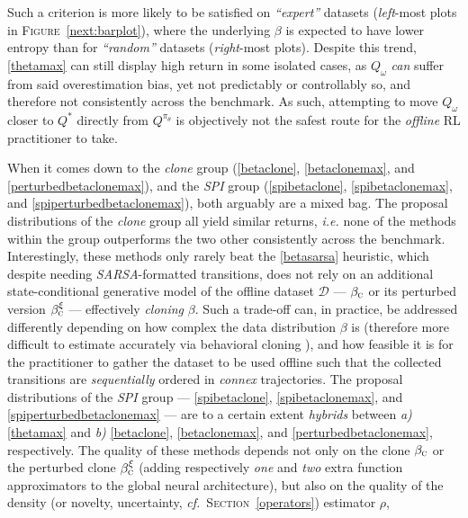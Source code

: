 Such a criterion is more likely to be satisfied
on \textit{``expert''} datasets (\emph{left}-most plots in \textsc{Figure}~\ref{next:barplot}),
where the underlying $\beta$ is expected to have lower entropy
than for \textit{``random''} datasets (\emph{right}-most plots).
Despite this trend, \ref{thetamax} can still display high return in some isolated cases,
as $Q_\omega$ \emph{can} suffer from said overestimation bias, yet not predictably or controllably so,
and therefore not consistently across the benchmark.
As such, attempting to move $Q_\omega$ closer to $Q^*$ directly from $Q^{\pi_\theta}$
is objectively not the safest route for the \emph{offline} RL practitioner to take.

When it comes down to the \textit{clone} group
(\ref{betaclone}, \ref{betaclonemax}, and \ref{perturbedbetaclonemax}),
and the \textit{SPI} group
(\ref{spibetaclone}, \ref{spibetaclonemax}, and \ref{spiperturbedbetaclonemax}),
both arguably are a mixed bag.
The proposal distributions of the \textit{clone} group all yield similar returns, \textit{i.e.}
none of the methods within the group outperforms the two other consistently across the benchmark.
Interestingly, these methods only rarely beat the \ref{betasarsa} heuristic, which despite needing
\textit{SARSA}-formatted transitions, does not rely on an additional state-conditional generative model of
the offline dataset $\mathcal{D}$ ---
$\beta_\textsc{c}$ or its perturbed version $\beta_\textsc{c}^\xi$ ---
effectively \textit{cloning} $\beta$.
Such a trade-off can, in practice, be addressed differently depending on how complex the data distribution $\beta$ is
(therefore more difficult to estimate accurately via behavioral cloning
\cite{Pomerleau1989-nh, Pomerleau1990-lm, Ratliff2007-fc, Bagnell2015-ni}),
and how feasible it is for the practitioner to gather the dataset to be used offline such that the
collected transitions are \emph{sequentially} ordered in \emph{connex} trajectories.
The proposal distributions of the \textit{SPI} group
--- \ref{spibetaclone}, \ref{spibetaclonemax}, and \ref{spiperturbedbetaclonemax} --- are to a certain extent
\textit{hybrids} between \textit{a)} \ref{thetamax} and \textit{b)}
\ref{betaclone}, \ref{betaclonemax}, and \ref{perturbedbetaclonemax}, respectively.
The quality of these methods depends not only on the clone $\beta_\textsc{c}$ or
the perturbed clone $\beta_\textsc{c}^\xi$ (adding respectively \emph{one} and \emph{two} extra
function approximators to the global neural architecture), but also on the quality of the density
(or novelty, uncertainty, \textit{cf.}~\textsc{Section}~\ref{operators}) estimator $\rho$,
